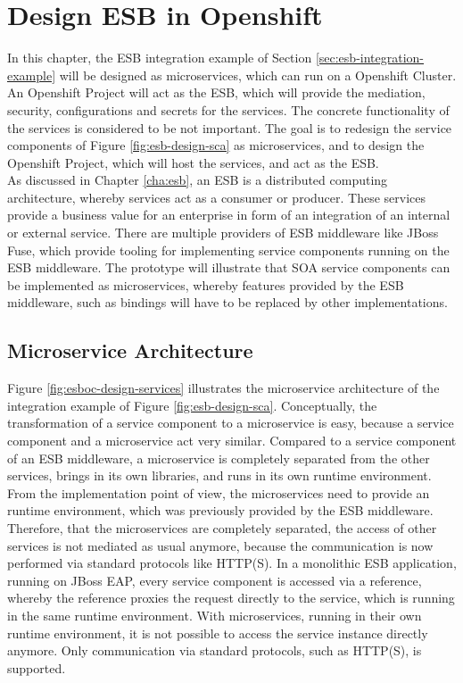 \chapter{Design ESB in Openshift}
\label{cha:esboc}
In this chapter, the ESB integration example of Section \vref{sec:esb-integration-example} will be designed as microservices, which can run on a Openshift Cluster. An Openshift Project will act as the ESB, which will provide the mediation, security, configurations and secrets for the services. The concrete functionality of the services is considered to be not important. The goal is to redesign the service components of Figure \vref{fig:esb-design-sca} as microservices, and to design the Openshift Project, which will host the services, and act as the ESB. \\

As discussed in Chapter \vref{cha:esb}, an ESB is a distributed computing architecture, whereby services act as a consumer or producer. These services provide a business value for an enterprise in form of an integration of an internal or external service. There are multiple providers of ESB middleware like JBoss Fuse, which provide tooling for implementing service components running on the ESB middleware. The prototype will illustrate that SOA service components can be implemented as microservices, whereby features provided by the ESB middleware, such as bindings will have to be replaced by other implementations.

\section{Microservice Architecture}
Figure \vref{fig:esboc-design-services} illustrates the microservice architecture of the integration example of Figure \vref{fig:esb-design-sca}. Conceptually, the transformation of a service component to a microservice is easy, because a service component and a microservice act very similar. Compared to a service component of an ESB middleware, a microservice is completely separated from the other services, brings in its own libraries, and runs in its own runtime environment. From the implementation point of view, the microservices need to provide an runtime environment, which was previously provided by the ESB middleware. Therefore, that the microservices are completely separated, the access of other services is not mediated as usual anymore, because the communication is now performed via standard protocols like HTTP(S). In a monolithic ESB application, running on JBoss EAP, every service component is accessed via a reference, whereby the reference proxies the request directly to the service, which is running in the same runtime environment. With microservices, running in their own runtime environment, it is not possible to access the service instance directly anymore. Only communication via standard protocols, such as HTTP(S), is supported.

